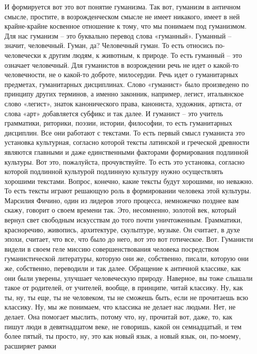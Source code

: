 И формируется вот это вот понятие гуманизма. Так вот,
гуманизм в античном смысле, простите, в возрожденческом смысле не имеет
никакого, имеет в ней крайне-крайне косвенное отношение к тому, что мы понимаем
под гуманизмом. Для нас гуманизм – это буквально перевод слова «гуманный».
Гуманный – значит, человечный. Гуман, да? Человечный гуман. То есть относись по-
человечески к другим людям, к животным, к природе. То есть гуманный – это
означает человечный. Для гуманистов в возрождении речь не идет о какой-то
человечности, не о какой-то доброте, милосердии. Речь идет о гуманитарных
предметах, гуманитарных дисциплинах. Слово «гуманист» было произведено по
принципу других терминов, а именно законник, например, легист, итальянское слово
«легист», знаток канонического права, канониста, художник, артиста, от слова
«арт» добавляется субфикс и так далее. И гуманист – это учитель грамматики,
риторики, поэзии, истории, философии, то есть гуманитарных дисциплин. Все они
работают с текстами. То есть первый смысл гуманиста это установка культурная,
согласно которой тексты латинской и греческой древности являются главными и даже
единственными факторами формирования подлинной культуры. Вот это, пожалуйста,
прочувствуйте. То есть это установка, согласно которой подлинной культурой
подлинную культуру нужно осуществлять хорошими текстами. Вопрос, конечно, какие
тексты будут хорошими, но неважно. То есть тексты играют решающую роль в
формировании человека этой культуры. Марсилия Фичино, один из лидеров этого
процесса, немножечко позднее вам скажу, говорит о своем времени так. Это,
несомненно, золотой век, который вернул свет свободным искусствам до того почти
уничтоженным. Грамматики, красноречию, живопись, архитектуре, скульптуре,
музыке. Он считает, в духе эпохи, считает, что все, что было до него, вот это
вот готическое. Вот. Гуманисти видели в своем геле миссию совершенствования
человека посредством гуманистической литературы, которую они же, собственно,
писали, которую они же, собственно, переводили и так далее. Обращение к античной
классике, как они были уверены, улучшает человеческую природу. Наверное, вы тоже
слышали такое от родителей, от учителей, вообще, в принципе, читай классику. Ну,
как ты, ну, ты еще, ты не человеком, ты не сможешь быть, если не прочитаешь всю
классику. Ну, мы же понимаем, что классика не делает нас людьми. Нет, не делает.
Она помогает мыслить, потому что, ну, прочитай вот, даже, то, как пишут люди в
девятнадцатом веке, не говоришь, какой он семнадцатый, и тем более пятый, ты
просто, ну, это как новый язык, а новый язык, он, по-моему, расширяет рамки
